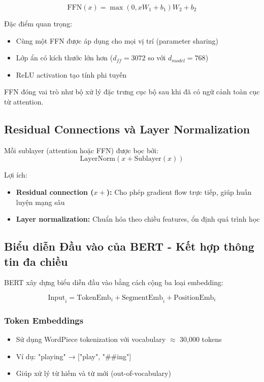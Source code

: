 $$ \text{FFN}(x) = \max(0, xW_1 + b_1)W_2 + b_2 $$

Đặc điểm quan trọng:
\begin{itemize}
    \item Cùng một FFN được áp dụng cho mọi vị trí (parameter sharing)
    \item Lớp ẩn có kích thước lớn hơn ($d_{ff}=3072$ so với $d_{model}=768$)
    \item ReLU activation tạo tính phi tuyến
\end{itemize}

FFN đóng vai trò như bộ xử lý đặc trưng cục bộ sau khi đã có ngữ cảnh toàn cục từ attention.

\subsection{Residual Connections và Layer Normalization}
\label{ssec:residual_layer_norm}
Mỗi sublayer (attention hoặc FFN) được bọc bởi:
$$ \text{LayerNorm}(x + \text{Sublayer}(x)) $$

Lợi ích:
\begin{itemize}
    \item \textbf{Residual connection ($x +$):} Cho phép gradient flow trực tiếp, giúp huấn luyện mạng sâu
    \item \textbf{Layer normalization:} Chuẩn hóa theo chiều features, ổn định quá trình học
\end{itemize}

\subsection{Biểu diễn Đầu vào của BERT - Kết hợp thông tin đa chiều}
\label{ssec:input_representation_bert}
BERT xây dựng biểu diễn đầu vào bằng cách cộng ba loại embedding:

$$ \text{Input}_i = \text{TokenEmb}_i + \text{SegmentEmb}_i + \text{PositionEmb}_i $$

\subsubsection{Token Embeddings}
\begin{itemize}
    \item Sử dụng WordPiece tokenization với vocabulary $\approx$ 30,000 tokens
    \item Ví dụ: "playing" → ["play", "\#\#ing"]
    \item Giúp xử lý từ hiếm và từ mới (out-of-vocabulary)
\end{itemize}

